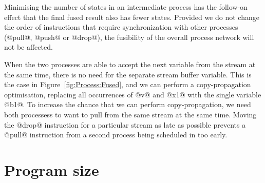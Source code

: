 Minimising the number of states in an intermediate process has the follow-on effect that the final fused result also has fewer states. Provided we do not change the order of instructions that require synchronization with other processes (@pull@, @push@ or @drop@), the fusibility of the overall process network will not be affected.


When the two processes are able to accept the next variable from the stream at the same time, there is no need for the separate stream buffer variable. This is the case in Figure~\ref{fig:Process:Fused}, and we can perform a copy-propagation optimisation, replacing all occurrences of @v@ and @x1@ with the single variable @b1@. To increase the chance that we can perform copy-propagation, we need both processess to want to pull from the same stream at the same time. Moving the @drop@ instruction for a particular stream as late as possible prevents a @pull@ instruction from a second process being scheduled in too early.









\section{Program size}
\label{s:Evaluation}

